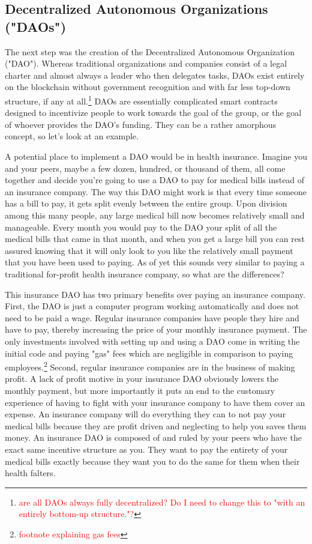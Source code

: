 \documentclass{article}[10pt]
\begin{document}
\subsection{Decentralized Autonomous Organizations ("DAOs")}
\label{subsection:DAOs}
The next step was the creation of the Decentralized Autonomous Organization ("DAO"). 
Whereas traditional organizations and companies consist of a legal charter and almost always a leader who then delegates tasks, DAOs exist entirely on the blockchain without government recognition and with far less top-down structure, if any at all.\footnote{
    \textcolor{red}{are all DAOs always fully decentralized? Do I need to change this to "with an entirely bottom-up structure."?}} 
DAOs are essentially complicated smart contracts designed to incentivize people to work towards the goal of the group, or the goal of whoever provides the DAO's funding. 
They can be a rather amorphous concept, so let’s look at an example. \par 

A potential place to implement a DAO would be in health insurance. 
Imagine you and your peers, maybe a few dozen, hundred, or thousand of them, all come together and decide you’re going to use a DAO to pay for medical bills instead of an insurance company. 
The way this DAO might work is that every time someone has a bill to pay, it gets split evenly between the entire group. Upon division among this many people, any large medical bill now becomes relatively small and manageable. 
Every month you would pay to the DAO your split of all the medical bills that came in that month, and when you get a large bill you can rest assured knowing that it will only look to you like the relatively small payment that you have been used to paying. 
As of yet this sounds very similar to paying a traditional for-profit health insurance company, so what are the differences?\par

This insurance DAO has two primary benefits over paying an insurance company. 
First, the DAO is just a computer program working automatically and does not need to be paid a wage.
Regular insurance companies have people they hire and have to pay, thereby increasing the price of your monthly insurance payment.
The only investments involved with setting up and using a DAO come in writing the initial code and paying "gas" fees which are negligible in comparison to paying employees.\footnote{
    \textcolor{red}{footnote explaining gas fees}}
Second, regular insurance companies are in the business of making profit.
A lack of profit motive in your insurance DAO obviously lowers the monthly payment, but more importantly it puts an end to the customary experience of having to fight with your insurance company to have them cover an expense. 
An insurance company will do everything they can to not pay your medical bills because they are profit driven and neglecting to help you saves them money. 
An insurance DAO is composed of and ruled by your peers who have the exact same incentive structure as you. 
They want to pay the entirety of your medical bills exactly because they want you to do the same for them when their health falters. \par 
\end{document}
